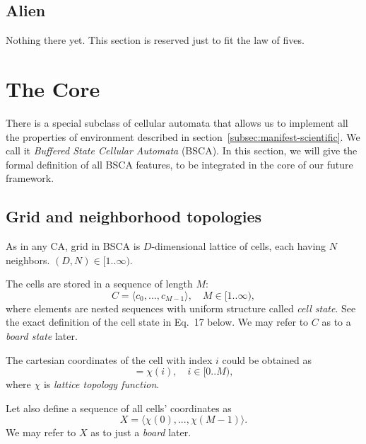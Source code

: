 \documentclass[a4paper,12pt,tikz,UTF8]{article}
\begin{document}
  \subsection{Alien}

  Nothing there yet. This section is reserved just to fit the law of fives.

  \newpage

  \section{The Core}
  \label{sec:the-core}

  There is a special subclass of cellular automata that allows us to implement all the properties of environment described in section~\ref{subsec:manifest-scientific}. We call it \textit{Buffered State Cellular Automata} (BSCA). In this section, we will give the formal definition of all BSCA features, to be integrated in the core of our future framework.

  \subsection{Grid and neighborhood topologies}

    As in any CA, grid in BSCA is $D$-dimensional lattice of cells, each having $N$ neighbors. $(D, N) \in [1 .. \infty)$.

    The cells are stored in a sequence of length $M$:
    \begin{equation}
      \label{eq:cells}
      C = \langle c_0, ..., c_{M - 1} \rangle, \quad M \in {[1 .. \infty)},
    \end{equation}
    where elements are nested sequences with uniform structure called \textit{cell state}. See the exact definition of the cell state in Eq.~17 below. We may refer to $C$ as to a \textit{board state} later.

    The cartesian coordinates of the cell with index $i$ could be obtained as 
    \begin{equation}
      [ x_0, ..., x_{D - 1} ] = \chi(i), \quad i \in {[0 .. M)},
    \end{equation}
    where $\chi$ is \textit{lattice topology function}. 

    Let also define a sequence of all cells' coordinates as 
    \begin{equation}
      X = \langle \chi(0), ..., \chi(M - 1) \rangle.
    \end{equation}
    We may refer to $X$ as to just a \textit{board} later.
\end{document}
